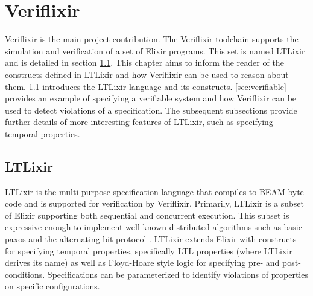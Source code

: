 \chapter{Veriflixir}
Veriflixir is the main project contribution. The Veriflixir toolchain supports the simulation and verification of a set of Elixir programs. This set is named LTLixir and is detailed in section \ref{sec:ltlixir}. This chapter aims to inform the reader of the constructs defined in LTLixir and how Veriflixir can be used to reason about them. \ref{sec:ltlixir} introduces the LTLixir language and its constructs. \ref{sec:verifiable} provides an example of specifying a verifiable system and how Veriflixir can be used to detect violations of a specification. The subsequent subsections provide further details of more interesting features of LTLixir, such as specifying temporal properties.
\section{LTLixir} \label{sec:ltlixir}
LTLixir is the multi-purpose specification language that compiles to BEAM byte-code and is supported for verification by Veriflixir. Primarily, LTLixir is a subset of Elixir supporting both sequential and concurrent execution. This subset is expressive enough to implement well-known distributed algorithms such as basic paxos \cite{basic-paxos} and the alternating-bit protocol \cite{ab-protocol}. LTLixir extends Elixir with constructs for specifying temporal properties, specifically LTL properties (where LTLixir derives its name) as well as Floyd-Hoare style logic for specifying pre- and post-conditions. Specifications can be parameterized to identify violations of properties on specific configurations. 
\par


